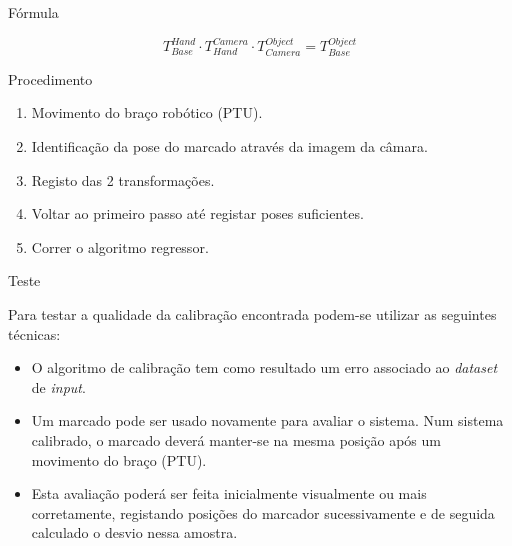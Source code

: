 \begin{frame}{Fórmula}

    \centering

    $$T_{Base}^{Hand} \cdot T_{Hand}^{Camera} \cdot T_{Camera}^{Object} = T_{Base}^{Object}$$

\end{frame}

\begin{frame}{Procedimento}
    
    \begin{enumerate}
        \item Movimento do braço robótico (PTU).
        \item Identificação da pose do marcado através da imagem da câmara. 
        \item Registo das 2 transformações.
        \item Voltar ao primeiro passo até registar poses suficientes.
        \item Correr o algoritmo regressor.
    \end{enumerate}

\end{frame}

\begin{frame}{Teste}

    Para testar a qualidade da calibração encontrada podem-se utilizar as seguintes técnicas:

    \begin{itemize}
        \item O algoritmo de calibração tem como resultado um erro associado ao \textit{dataset} de \textit{input}.
        \item Um marcado pode ser usado novamente para avaliar o sistema. Num sistema calibrado, o marcado deverá manter-se na mesma posição após um movimento do braço (PTU).
        \item Esta avaliação poderá ser feita inicialmente visualmente ou mais corretamente, registando posições do marcador sucessivamente e de seguida calculado o desvio nessa amostra.
    \end{itemize}
    
\end{frame}

